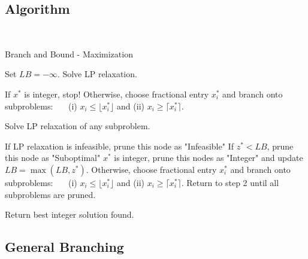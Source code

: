 \documentclass[../open-optimization/open-optimization.tex]{subfiles}
\begin{document}
\subsection{Algorithm}


\begin{algorithm}[H]
\\
\caption{Branch and Bound - Maximization}\label{alg:branch-and-bound-max}
\begin{algorithmic}[1]
	\State Set $LB = - \infty$.
 	\State Solve LP relaxation. 
	\begin{algsubstates}
        		\State If $x^*$ is integer, stop!
        		\State Otherwise, choose fractional entry $x_i^*$ and branch onto subproblems:\ \ \ \hspace{3cm}  (i) $x_i \leq \lfloor x^*_i \rfloor$ and (ii) $x_i \geq \lceil x^*_i \rceil$.        \end{algsubstates}
	\State Solve LP relaxation of any subproblem.
		\begin{algsubstates}
		\State If LP relaxation is infeasible, prune this node as "Infeasible"
        		\State If $z^* < LB$, prune this node as "Suboptimal"
		\State $x^*$ is integer, prune this nodes as "Integer" and update $LB = \max(LB, z^*)$.
		\State Otherwise, choose fractional entry $x_i^*$ and branch onto subproblems:\ \ \ \hspace{3cm}  (i) $x_i \leq \lfloor x^*_i \rfloor$ and (ii) $x_i \geq \lceil x^*_i \rceil$.     Return to step 2 until all subproblems are pruned.
      \end{algsubstates}
      \State Return best integer solution found.
	\end{algorithmic}
\end{algorithm}

%
%
%




\subsection{General Branching}
\end{document}
